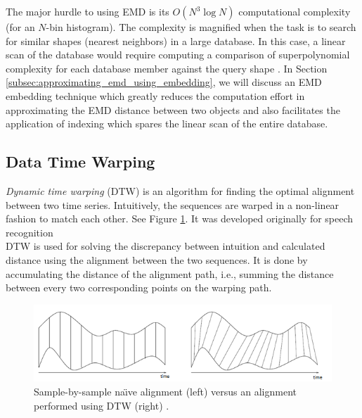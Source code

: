 \iftoggle{edit-mode}{\hspace{0pt}\marginpar{EMD drawback}}{}
The major hurdle to using EMD is its $O\left( {{N^3}\log N} \right)$ computational complexity (for an $N$-bin histogram). The complexity is magnified when the task is to search for similar shapes (nearest neighbors) in a large database. In this case, a linear scan of the database would require computing a comparison of superpolynomial complexity for each database member against the query shape \cite{grauman2004fast}. In Section \ref{subsec:approximating_emd_using_embedding}, we will discuss an EMD embedding technique which greatly reduces the computation effort in approximating the EMD distance between two objects and also facilitates the application of indexing which spares the linear scan of the entire database.



\subsection{Data Time Warping}
\label{subsec:dtw}

\iftoggle{edit-mode}{\hspace{0pt}\marginpar{Introduction}}{}
\emph{Dynamic time warping} (DTW) is an algorithm for finding the optimal alignment between two time series. Intuitively, the sequences are warped in a non-linear fashion to match each other. See Figure \ref{fig:dtw_dequence_demo}. It was developed originally for speech recognition\\ 


DTW is used for solving the discrepancy between intuition and calculated distance using the alignment between the two sequences. It is done by accumulating the distance of the alignment path, i.e., summing the distance between every two corresponding points on the warping path. 

\begin{figure}[h!] 
\centering
\includegraphics[width=1\textwidth]{./figures/dtw_dequence_demo}      
\caption{Sample-by-sample na\"{\i}ve alignment (left) versus an alignment performed using DTW (right) \cite{rath2003word}.}
\label{fig:dtw_dequence_demo}
\end{figure}

